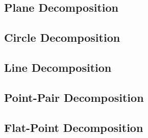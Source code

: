\documentclass[12pt]{article}
\begin{document}
\subsection{Plane Decomposition}

\subsection{Circle Decomposition}

\subsection{Line Decomposition}

\subsection{Point-Pair Decomposition}

\subsection{Flat-Point Decomposition}
\end{document}
